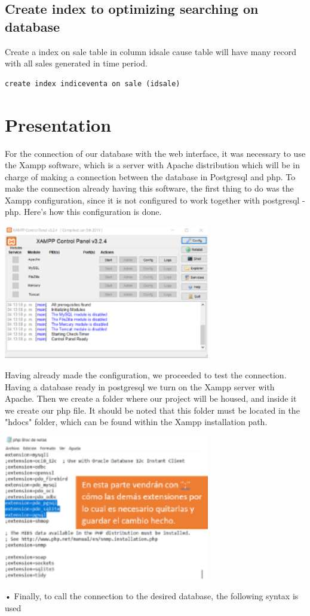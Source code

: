 \documentclass{article}
\begin{document}
\subsection{Create index to optimizing searching on database}
Create a index on sale table in column idsale cause table will have  many record with all sales generated in time period.
\begin{verbatim}
create index indiceventa on sale (idsale)
\end{verbatim}
\section{Presentation}
For the connection of our database with the web interface, it was necessary to use the Xampp software, which is a server with Apache distribution which will be in charge of making a connection between the database in Postgresql and php.
To make the connection already having this software, the first thing to do was the Xampp configuration, since it is not configured to work together with postgresql - php. Here's how this configuration is done.
\begin{center}
\includegraphics[width=9cm]{xampp1}
\end{center}
Having already made the configuration, we proceeded to test the connection. Having a database ready in postgresql we turn on the Xampp server with Apache. Then we create a folder where our project will be housed, and inside it we create our php file. It should be noted that this folder must be located in the "hdocs" folder, which can be found within the Xampp installation path.
\begin{center}
\includegraphics[width=9cm]{xampp2}
\end{center}•
Finally, to call the connection to the desired database, the following syntax is used
\end{document}
